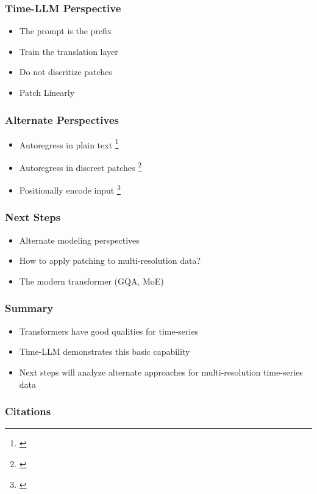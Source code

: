 \documentclass{beamer}
\begin{document}
\begin{frame}
    \frametitle{Time-LLM Perspective}
    \begin{itemize}
        \item{The prompt is the prefix}
        \item{Train the translation layer}
        \item{Do not discritize patches}
        \item{Patch Linearly}
    \end{itemize}
\end{frame}
\begin{frame}
    \frametitle{Alternate Perspectives}
    \begin{itemize}
        \item{Autoregress in plain text} \footnote{\textcite{gruver2024largelanguagemodelszeroshot}}
        \item{Autoregress in discreet patches} \footnote{\textcite{ansari2024chronoslearninglanguagetime}}
        \item{Positionally encode input} \footnote{\textcite{rasul2024lagllamafoundationmodelsprobabilistic}}
    \end{itemize}
\end{frame}
\begin{frame}
    \frametitle{Next Steps}
    \begin{itemize}
        \item Alternate modeling perspectives
        \item How to apply patching to multi-resolution data?
        \item The modern transformer (GQA, MoE)
    \end{itemize}
    \end{frame}
\begin{frame}
    \frametitle{Summary}
    \begin{itemize}
        \item Transformers have good qualities for time-series
        \item Time-LLM demonstrates this basic capability
        \item Next steps will analyze alternate approaches for multi-resolution time-series data
    \end{itemize}
    \end{frame}
\begin{frame}[allowframebreaks]
\frametitle{Citations}
    \printbibliography
\end{frame}
\end{document}
